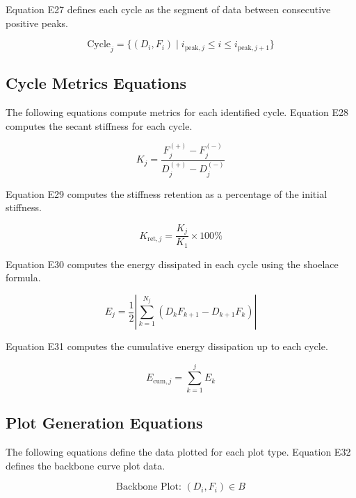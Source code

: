 \documentclass[11pt,a4paper]{article}
\begin{document}
Equation E27 defines each cycle as the segment of data between consecutive positive peaks.

\begin{equation}
\text{Cycle}_j = \{ (D_i, F_i) \mid i_{\text{peak},j} \le i \le i_{\text{peak},j+1} \}
\tag{E27}
\label{eq:E27}
\end{equation}

\subsection{Cycle Metrics Equations}

The following equations compute metrics for each identified cycle. Equation E28 computes the secant stiffness for each cycle.

\begin{equation}
K_j = \frac{F_j^{(+)} - F_j^{(-)}}{D_j^{(+)} - D_j^{(-)}}
\tag{E28}
\label{eq:E28}
\end{equation}

Equation E29 computes the stiffness retention as a percentage of the initial stiffness.

\begin{equation}
K_{\text{ret},j} = \frac{K_j}{K_1} \times 100\%
\tag{E29}
\label{eq:E29}
\end{equation}

Equation E30 computes the energy dissipated in each cycle using the shoelace formula.

\begin{equation}
E_j = \frac{1}{2} \left| \sum_{k=1}^{N_j} (D_k F_{k+1} - D_{k+1} F_k) \right|
\tag{E30}
\label{eq:E30}
\end{equation}

Equation E31 computes the cumulative energy dissipation up to each cycle.

\begin{equation}
E_{\text{cum},j} = \sum_{k=1}^{j} E_k
\tag{E31}
\label{eq:E31}
\end{equation}

\subsection{Plot Generation Equations}

The following equations define the data plotted for each plot type. Equation E32 defines the backbone curve plot data.

\begin{equation}
\text{Backbone Plot: } (D_i, F_i) \in B
\tag{E32}
\label{eq:E32}
\end{equation}
\end{document}
